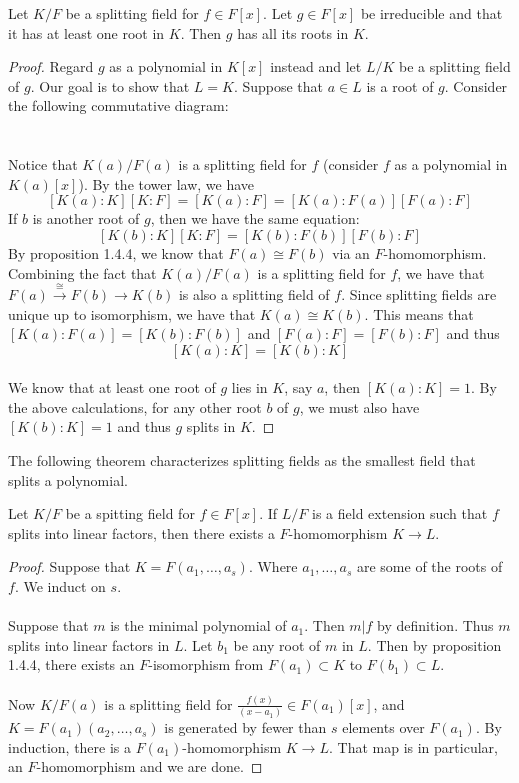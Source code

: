 \documentclass[a4paper]{article}
\begin{document}
\begin{thm}{}{} Let $K/F$ be a splitting field for $f\in F[x]$. Let $g\in F[x]$ be irreducible and that it has at least one root in $K$. Then $g$ has all its roots in $K$. \tcbline
\begin{proof}
Regard $g$ as a polynomial in $K[x]$ instead and let $L/K$ be a splitting field of $g$. Our goal is to show that $L=K$. Suppose that $a\in L$ is a root of $g$. Consider the following commutative diagram: \\
\\~\\
Notice that $K(a)/F(a)$ is a splitting field for $f$ (consider $f$ as a polynomial in $K(a)[x]$). By the tower law, we have $$[K(a):K][K:F]=[K(a):F]=[K(a):F(a)][F(a):F]$$ If $b$ is another root of $g$, then we have the same equation: $$[K(b):K][K:F]=[K(b):F(b)][F(b):F]$$ By proposition 1.4.4, we know that $F(a)\cong F(b)$ via an $F$-homomorphism. Combining the fact that $K(a)/F(a)$ is a splitting field for $f$, we have that $F(a)\overset{\cong}{\rightarrow}F(b)\rightarrow K(b)$ is also a splitting field of $f$. Since splitting fields are unique up to isomorphism, we have that $K(a)\cong K(b)$. This means that $[K(a):F(a)]=[K(b):F(b)]$ and $[F(a):F]=[F(b):F]$ and thus $$[K(a):K]=[K(b):K]$$~\\
We know that at least one root of $g$ lies in $K$, say $a$, then $[K(a):K]=1$. By the above calculations, for any other root $b$ of $g$, we must also have $[K(b):K]=1$ and thus $g$ splits in $K$. 
\end{proof}
\end{thm}

The following theorem characterizes splitting fields as the smallest field that splits a polynomial. 

\begin{thm}{}{} Let $K/F$ be a spitting field for $f\in F[x]$. If $L/F$ is a field extension such that $f$ splits into linear factors, then there exists a $F$-homomorphism $K\to L$. \tcbline
\begin{proof}
Suppose that $K=F(a_1,\dots,a_s)$. Where $a_1,\dots,a_s$ are some of the roots of $f$. We induct on $s$. \\~\\
Suppose that $m$ is the minimal polynomial of $a_1$. Then $m|f$ by definition. Thus $m$ splits into linear factors in $L$. Let $b_1$ be any root of $m$ in $L$. Then by proposition 1.4.4, there exists an $F$-isomorphism from $F(a_1)\subset K$ to $F(b_1)\subset L$. \\~\\
Now $K/F(a)$ is a splitting field for $\frac{f(x)}{(x-a_1)}\in F(a_1)[x]$, and $K=F(a_1)(a_2,\dots,a_s)$ is generated by fewer than $s$ elements over $F(a_1)$. By induction, there is a $F(a_1)$-homomorphism $K\to L$. That map is in particular, an $F$-homomorphism and we are done. 
\end{proof}
\end{thm}
\end{document}
